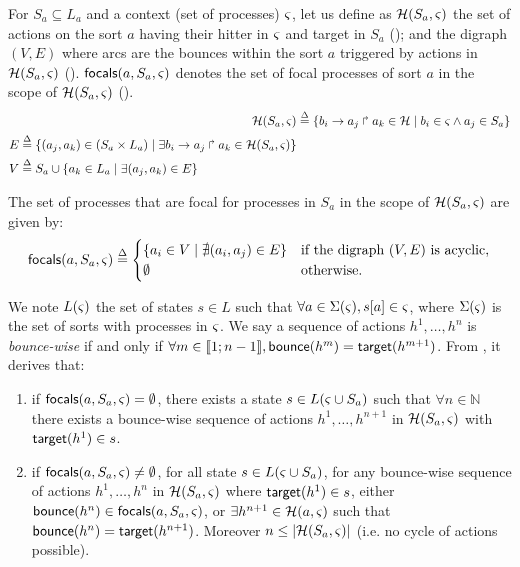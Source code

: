 For $S_a\subseteq L_a$ and a context (set of processes) $\varsigma$, let us define as $\mathcal{H}(S_a,\varsigma)$
the set of actions on the sort $a$ having their hitter in $\varsigma$ and target in $S_a$
();
and the digraph $(V, E)$ where arcs are the bounces within the sort $a$ triggered by actions
in $\mathcal{H}(S_a,\varsigma)$ ().
$\mathsf{focals}(a,S_a,\varsigma)$ denotes the set of focal processes of sort $a$ in the scope of
$\mathcal{H}(S_a,\varsigma)$ ().
\begin{align}
\mathcal{H}(S_a,\varsigma) & \stackrel{\Delta}= \{ b_i\rightarrow a_j\Rsh a_k\in\mathcal{H} \mid b_i\in\varsigma \wedge a_j\in S_a \}
\label{eq:PHa-ctx}
\\
\begin{split}
E  & \stackrel{\Delta}= \{(a_j,a_k)\in (S_a \times L_a) \mid 
			\exists b_i\rightarrow a_j\Rsh a_k\in \mathcal{H}(S_a,\varsigma) \}
\\
V & \stackrel{\Delta}= S_a \cup \{ a_k\in L_a\mid \exists (a_j,a_k)\in E\}
\end{split}
\label{eq:bounce-graph}
\end{align}

\begin{definition}\label{def:focals}
The set of processes that are focal for processes in $S_a$ in the scope of $\mathcal{H}(S_a,\varsigma)$
are given by:
\[
\mathsf{focals}(a,S_a,\varsigma) \stackrel{\Delta}=
\begin{cases}
\{ a_i \in V \mid \nexists (a_i,a_j)\in E\} & \text{if the digraph $(V,E)$ is acyclic},\\
\emptyset & \text{otherwise.}\\
\end{cases}
\]
\end{definition}

We note $L(\varsigma)$ the set of states $s\in L$ such that $\forall a\in\Sigma(\varsigma), {s[a]}\in\varsigma$,
where $\Sigma(\varsigma)$ is the set of sorts with processes in $\varsigma$.
We say a sequence of actions $h^1,\dots,h^n$ is \emph{bounce-wise} if and only if
$\forall m\in\llbracket 1 ; n-1 \rrbracket, \mathsf{bounce}(h^m)=\mathsf{target}(h^{m+1})$.
From , it derives that:
\begin{enumerate}
\item if $\mathsf{focals}(a,S_a,\varsigma)=\emptyset$, there exists a 
state $s\in L(\varsigma\cup S_a)$ such that $\forall n\in\mathbb N$ there
exists a bounce-wise sequence of actions $h^1,\dots,h^{n+1}$ in $\mathcal{H}(S_a,\varsigma)$ 
with $\mathsf{target}(h^1)\in s$.
\item if $\mathsf{focals}(a,S_a,\varsigma)\neq\emptyset$, for all
state $s\in L(\varsigma\cup S_a)$,
for any bounce-wise sequence of actions $h^1,\dots,h^n$ in $\mathcal{H}(S_a,\varsigma)$ where $\mathsf{target}(h^1)\in
s$,
either
 $\mathsf{bounce}(h^n) \in \mathsf{focals}(a,S_a,\varsigma)$,
or
$\exists h^{n+1}\in \mathcal{H}(a,\varsigma)$ such that $\mathsf{bounce}(h^n) = \mathsf{target}(h^{n+1})$.
Moreover $n\leq|\mathcal{H}(S_a,\varsigma)|$ (i.e. no cycle of actions possible).
\end{enumerate}

